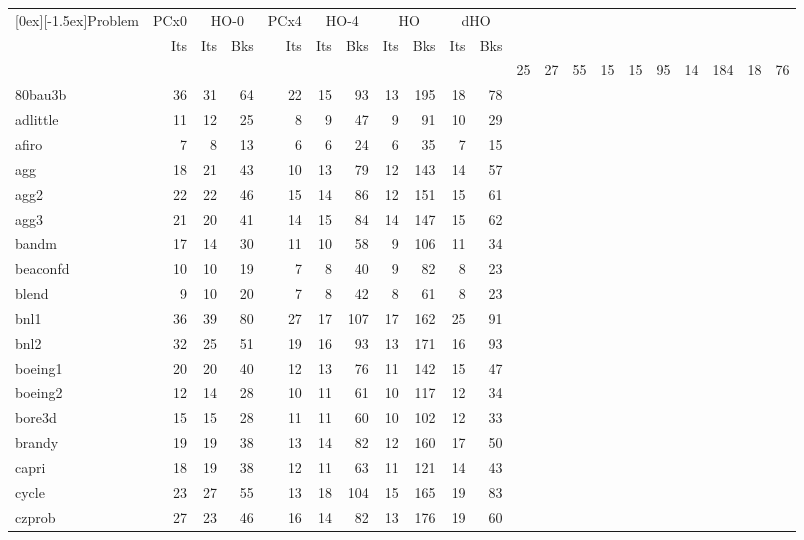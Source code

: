 \begin{small}
\begin{longtable}{|l|r|rr||r|rr||rr||rr|} \hline 
\raisebox{-1.5ex}[0ex][-1.5ex]{Problem} & \multicolumn{1}{c|}{PCx0}
        & \multicolumn{2}{c||}{HO-0}
        & \multicolumn{1}{c|}{PCx4} 
        & \multicolumn{2}{c||}{HO-4} 
        & \multicolumn{2}{c||}{HO\raisebox{1pt}{-$\infty$}} 
        & \multicolumn{2}{c|}{dHO} \\ \cline{2-11}
        & Its
        & Its & Bks
        & Its
        & Its & Bks
        & Its & Bks
        & Its & Bks \\ \hline
\endhead
\hline
\multicolumn{11}{c}{\raisebox{-1ex}{Table~\ref{MLresults}:
Comparison with Mehrotra and Li's algorithm.}}
\endfoot
\label{MLresults}
25fv47 & 25 & 27 & 55 & 15 & 15 & 95 & 14 & 184 & 18 & 76 \\
80bau3b & 36 & 31 & 64  & 22 & 15 & 93 & 13 & 195 & 18 & 78 \\
adlittle & 11 & 12 & 25  & 8 & 9 & 47 & 9 & 91 & 10 & 29 \\
afiro & 7 & 8 & 13  & 6 & 6 & 24 & 6 & 35 & 7 & 15 \\
agg & 18 & 21 & 43  & 10 & 13 & 79 & 12 & 143 & 14 & 57 \\
agg2 & 22 & 22 & 46  & 15 & 14 & 86 & 12 & 151 & 15 & 61 \\
agg3 & 21 & 20 & 41  & 14 & 15 & 84 & 14 & 147 & 15 & 62 \\
bandm & 17 & 14 & 30  & 11 & 10 & 58 & 9 & 106 & 11 & 34 \\
beaconfd & 10 & 10 & 19  & 7 & 8 & 40 & 9 & 82 & 8 & 23 \\
blend & 9 & 10 & 20  & 7 & 8 & 42 & 8 & 61 & 8 & 23 \\
bnl1 & 36 & 39 & 80  & 27 & 17 & 107 & 17 & 162 & 25 & 91 \\
bnl2 & 32 & 25 & 51  & 19 & 16 & 93 & 13 & 171 & 16 & 93 \\
boeing1 & 20 & 20 & 40  & 12 & 13 & 76 & 11 & 142 & 15 & 47 \\
boeing2 & 12 & 14 & 28  & 10 & 11 & 61 & 10 & 117 & 12 & 34 \\
bore3d & 15 & 15 & 28  & 11 & 11 & 60 & 10 & 102 & 12 & 33 \\
brandy & 19 & 19 & 38  & 13 & 14 & 82 & 12 & 160 & 17 & 50 \\
capri & 18 & 19 & 38  & 12 & 11 & 63 & 11 & 121 & 14 & 43 \\
cycle & 23 & 27 & 55  & 13 & 18 & 104 & 15 & 165 & 19 & 83 \\
czprob & 27 & 23 & 46  & 16 & 14 & 82 & 13 & 176 & 19 & 60 \\

\end{longtable}
\end{small}
